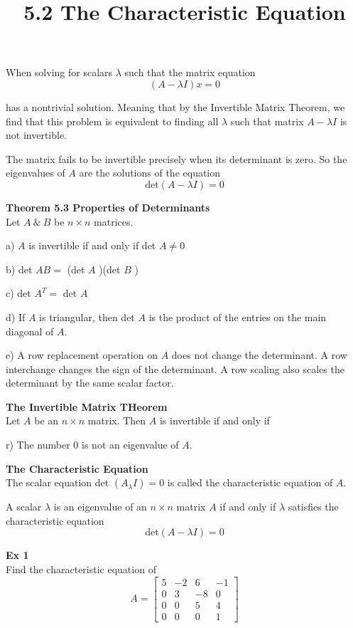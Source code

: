 \documentclass{article}
\title{5.2 The Characteristic Equation}
\begin{document}
  \maketitle
  When solving for scalars $ \lambda $ such that the matrix equation
  \[
    (A-\lambda I)x=0
  \]

  has a nontrivial solution. Meaning that by the Invertible Matrix Theorem, we find that this problem is equivalent to finding all $ \lambda $ such that matrix $ A - \lambda I $ is not invertible.

  The matrix fails to be invertible precisely when its determinant is zero. So the eigenvalues of $ A $ are the solutions of the equation
  \[
    \text{det}(A-\lambda I) = 0
  \]

  \textbf{Theorem 5.3 Properties of Determinants}\\
  Let $ A ~\&~ B $ be $ n \times n $ matrices.

  a) $ A $ is invertible if and only if det $ A\neq0 $
  
  b) det $ AB =$ (det $ A $ )(det $ B $ )

  c) det $ A^{T} =$ det $ A $

  d) If $ A $ is triangular, then det $ A $ is the product of the entries on the main diagonal of $ A $.

  e) A row replacement operation on $ A $ does not change the determinant. A row interchange changes the sign of the determinant. A row scaling also scales the determinant by the same scalar factor.

  \textbf{The Invertible Matrix THeorem}\\
  Let $ A $ be an $ n \times n $ matrix. Then $ A $ is invertible if and only if
  
  r) The number $ 0 $ is not an eigenvalue of $ A $.

  \textbf{The Characteristic Equation}\\
  The scalar equation det $ (A_ \lambda I)=0 $ is called the characteristic equation of $ A $.

  A scalar $ \lambda $ is an eigenvalue of an $ n \times n $ matrix $ A $ if and only if $ \lambda $ satisfies the characteristic equation
  \[
    \text{det}(A-\lambda I)=0
  \]

  \textbf{Ex 1}\\
  Find the characteristic equation of 
  \[
    A = 
    \begin{bmatrix}
      5 &-2 &6 &-1\\
      0 &3 &-8 &0\\
      0 &0 &5 &4\\
      0 &0 &0 &1
    \end{bmatrix}
  \]
\end{document}
